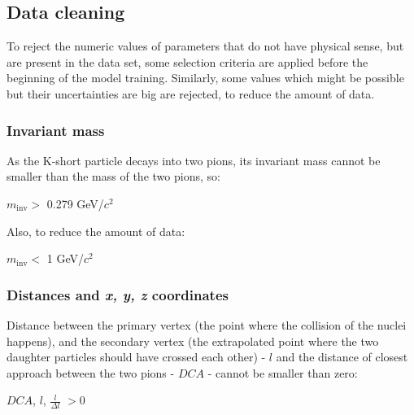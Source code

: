 \subsection{Data cleaning}
To reject the numeric values of parameters that do not have physical sense, but are present in the data set, some selection criteria are applied before the beginning of the model training. Similarly, some values which might be possible but their uncertainties are big are rejected, to reduce the amount of data.

\subsubsection{Invariant mass}
As the K-short particle decays into two pions, its invariant mass cannot be smaller than the mass of the two pions, so:
\begin{center}
    $m_\text{inv} >$ 0.279 GeV/$c^2$
\end{center}
Also, to reduce the amount of data:
\begin{center}
   $m_\text{inv} <$ 1 GeV/$c^2$
\end{center}

\subsubsection{Distances and \emph{x, y, z} coordinates}
Distance between the primary vertex (the point where the collision of the nuclei happens), and the secondary vertex (the extrapolated point where the two daughter particles should have crossed each other)  - $l$ and the distance of closest approach between the two pions - $DCA$ -  cannot be smaller than zero:
\begin{center}
    $DCA$, $l$, $\frac{l}{\Delta l}$ $> 0$
\end{center}

